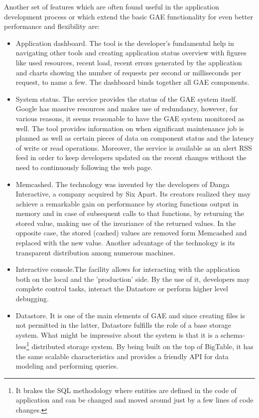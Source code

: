 Another set of features which are often found useful in the application development process or which extend the basic GAE functionality for even better performance and flexibility are:
\begin{itemize}
\item{Application dashboard. The tool is the developer's fundamental help in navigating other tools and creating application status overview with figures like used resources, recent load, recent errors generated by the application and charts showing the number of requests per second or milliseconds per request, to name a few. The dashboard binds together all GAE components.}
\item{System status. The service provides the status of the GAE system itself. Google has massive resources and makes use of redundancy, however, for various reasons, it seems reasonable to have the GAE system monitored as well. The tool provides information on when significant maintenance job is planned as well as certain pieces of data on component status and the latency of write or read operations. Moreover, the service is available as an alert RSS feed in order to keep developers updated on the recent changes without the need to continuously following the web page.}
\item{Memcashed. The technology was invented by the developers of Danga Interactive, a company acquired by Six Apart. Its creators realized they may achieve a remarkable gain on performance by storing functions output in memory and in case of subsequent calls to that functions, by returning the stored value, making use of the invariance of the returned values. In the opposite case, the stored (cashed) values are removed form Memcashed and replaced with the new value. Another advantage of the technology is its transparent distribution among numerous machines.} 
\item{Interactive console.The facility allows for interacting with the application both on the local and the 'production' side. By the use of it, developers may complete control tasks, interact the Datastore or perform higher level debugging.}
\item{Datastore}. It is one of the main elements of GAE and since creating files is not permitted in the latter, Datastore fulfills the role of a base storage system. What might be impressive about the system is that it is a schema-less\footnote{It brakes the SQL methodology where entities are defined in the code of application and can be changed and moved around just by a few lines of code changes.} distributed storage system. By being built on the top of BigTable, it has the same scalable characteristics and provides a friendly API for data modeling and performing queries. 

\end{itemize}
